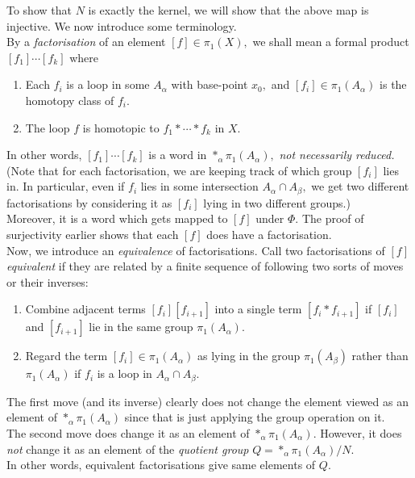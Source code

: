 \documentclass[12pt]{article}
\theoremstyle{definition}
\numberwithin{thm}{section}
\begin{document}
	To show that $N$ is exactly the kernel, we will show that the above map is injective. We now introduce some terminology.\\
	By a \emph{factorisation} of an element $[f] \in \pi_1(X),$ we shall mean a formal product $[f_1]\cdots[f_k]$ where
	\begin{enumerate}
		\item Each $f_i$ is a loop in some $A_\alpha$ with base-point $x_0,$ and $[f_i] \in \pi_1(A_\alpha)$ is the homotopy class of $f_i.$
		\item The loop $f$ is homotopic to $f_1*\cdots*f_k$ in $X.$
	\end{enumerate}
	In other words, $[f_1]\cdots[f_k]$ is a word in $*_\alpha \pi_1(A_\alpha),$ \emph{not necessarily reduced.} \\
	(Note that for each factorisation, we are keeping track of which group $[f_i]$ lies in. In particular, even if $f_i$ lies in some intersection $A_\alpha \cap A_\beta,$ we get two different factorisations by considering it as $[f_i]$ lying in two different groups.) \\
	Moreover, it is a word which gets mapped to $[f]$ under $\Phi.$ The proof of surjectivity earlier shows that each $[f]$ does have a factorisation. \\
	Now, we introduce an \emph{equivalence} of factorisations. Call two factorisations of $[f]$ \emph{equivalent} if they are related by a finite sequence of following two sorts of moves or their inverses:
	\begin{enumerate}
		\item Combine adjacent terms $[f_i][f_{i+1}]$ into a single term $[f_i*f_{i+1}]$ if $[f_i]$ and $[f_{i+1}]$ lie in the same group $\pi_1(A_\alpha).$
		\item Regard the term $[f_i] \in \pi_1(A_\alpha)$ as lying in the group $\pi_1(A_\beta)$ rather than $\pi_1(A_\alpha)$ if $f_i$ is a loop in $A_\alpha \cap A_\beta.$
	\end{enumerate}
	The first move (and its inverse) clearly does not change the element viewed as an element of $*_\alpha\pi_1(A_\alpha)$ since that is just applying the group operation on it.\\
	The second move does change it as an element of $*_\alpha\pi_1(A_\alpha).$ However, it does \emph{not} change it as an element of the \emph{quotient group} $Q = *_\alpha\pi_1(A_\alpha)/N.$\\
	In other words, equivalent factorisations give same elements of $Q.$
\end{document}
